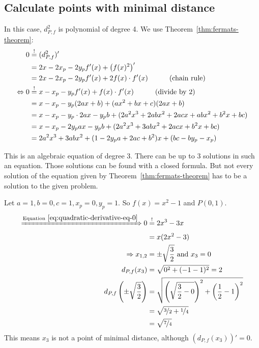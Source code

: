 \subsection{Calculate points with minimal distance}
In this case, $d_{P,f}^2$ is polynomial of degree 4. 
We use Theorem~\ref{thm:fermats-theorem}:\nobreak
\begin{align}
    0     &\overset{!}{=} (d_{P,f}^2)'\\
          &= 2x -2 x_p -2y_p f'(x) + \left (f(x)^2 \right )'\\
          &= 2x -2 x_p -2y_p f'(x) + 2 f(x) \cdot f'(x) \rlap{\hspace*{3em}(chain rule)}\label{eq:minimizingFirstDerivative}\\
\Leftrightarrow 0 &\overset{!}{=} x -x_p -y_p f'(x) + f(x) \cdot f'(x) \rlap{\hspace*{3em}(divide by 2)}\label{eq:minimizingFirstDerivative}\\
          &= x -x_p -y_p (2ax+b) + (ax^2+bx+c)(2ax+b)\\
          &= x -x_p -y_p \cdot 2ax- y_p b + (2 a^2 x^3+2 a b x^2+2 a c x+ab x^2+b^2 x+bc)\\
          &= x -x_p -2y_p ax- y_p b + (2a^2 x^3 + 3 ab x^2 + 2acx + b^2 x + bc)\\
          &= 2a^2 x^3 + 3 ab x^2 + (1 -2y_p a+ 2ac + b^2)x +(bc-by_p-x_p)\label{eq:quadratic-derivative-eq-0}
\end{align}

This is an algebraic equation of degree 3.
There can be up to 3 solutions in such an equation. Those solutions
can be found with a closed formula. But not every solution of the
equation given by Theorem~\ref{thm:fermats-theorem}
has to be a solution to the given problem.
\goodbreak
\begin{example}\label{ex:false-positive}
    Let $a = 1,  b = 0,  c= 1, x_p= 0, y_p = 1$.
    So $f(x) = x^2 - 1$ and $P(0, 1)$.
    \begin{align}
        \xRightarrow{\text{Equation}~\ref{eq:quadratic-derivative-eq-0}} 0 &\stackrel{!}{=} 2x^3 - 3x\\
        &= x(2x^2-3)\\
        \Rightarrow x_{1,2} &= \pm \sqrt{\frac{3}{2}} \text{ and } x_3 = 0\\
        d_{P,f}(x_3) &= \sqrt{0^2 + (-1-1)^2} = 2\\
        d_{P,f} \left (\pm \sqrt{\frac{3}{2}} \right ) &= \sqrt{\left (\sqrt{\frac{3}{2} - 0} \right )^2 + \left (\frac{1}{2}-1 \right )^2}\\
            &= \sqrt{\nicefrac{3}{2}+\nicefrac{1}{4}} \\
            &= \sqrt{\nicefrac{7}{4}}\\
    \end{align}
    This means $x_3$ is not a point of minimal distance, although
    $(d_{P,f}(x_3))' = 0$.
\end{example}


